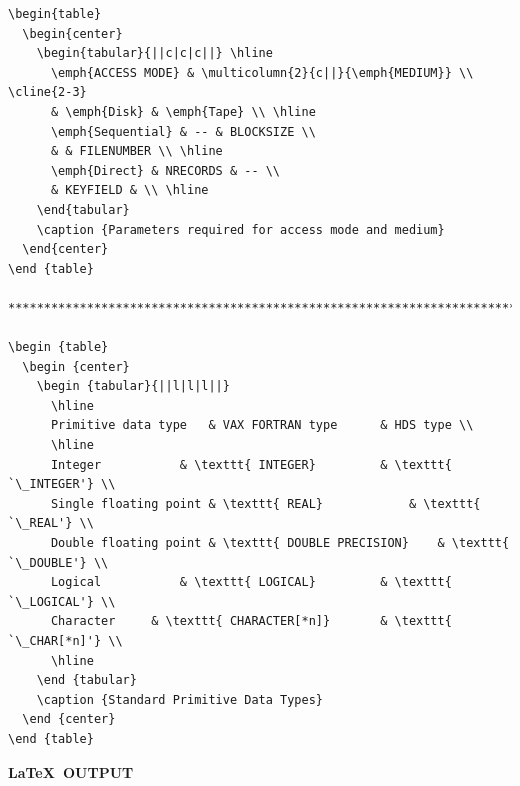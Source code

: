 \documentclass[11pt,twoside]{article}
\begin{document}
\begin{verbatim}
\begin{table}
  \begin{center}
    \begin{tabular}{||c|c|c||} \hline
      \emph{ACCESS MODE} & \multicolumn{2}{c||}{\emph{MEDIUM}} \\ \cline{2-3}
      & \emph{Disk} & \emph{Tape} \\ \hline
      \emph{Sequential} & -- & BLOCKSIZE \\
      & & FILENUMBER \\ \hline
      \emph{Direct} & NRECORDS & -- \\
      & KEYFIELD & \\ \hline
    \end{tabular}
    \caption {Parameters required for access mode and medium}
  \end{center}
\end {table}

******************************************************************************

\begin {table}
  \begin {center}
    \begin {tabular}{||l|l|l||}
      \hline
      Primitive data type	& VAX FORTRAN type		& HDS type \\
      \hline
      Integer			& \texttt{ INTEGER}			& \texttt{ `\_INTEGER'} \\
      Single floating point	& \texttt{ REAL}			& \texttt{ `\_REAL'} \\
      Double floating point	& \texttt{ DOUBLE PRECISION}	& \texttt{ `\_DOUBLE'} \\
      Logical			& \texttt{ LOGICAL}			& \texttt{ `\_LOGICAL'} \\
      Character		& \texttt{ CHARACTER[*n]}		& \texttt{ `\_CHAR[*n]'} \\
      \hline
    \end {tabular}
    \caption {Standard Primitive Data Types}
  \end {center}
\end {table}
\end{verbatim}

\newpage

\begin{center}
  \textbf{\LaTeX\ OUTPUT}
\end{center}
\end{document}
